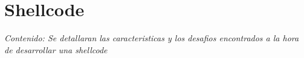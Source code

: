 \chapter{Shellcode}

\textit{Contenido: Se detallaran las caracteristicas y los desafios encontrados
a la hora de desarrollar una shellcode}
\vspace{1em}





